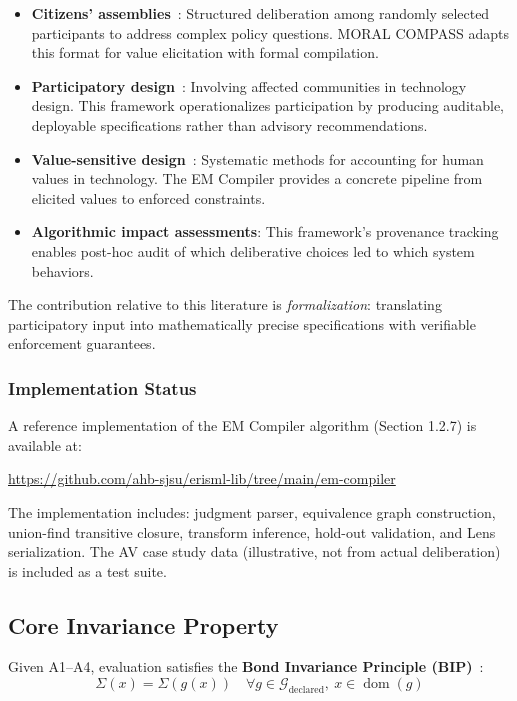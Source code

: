 \documentclass[12pt]{article}
\begin{document}
\begin{itemize}
\item \textbf{Citizens' assemblies}~\cite{fishkin2018}: Structured deliberation among randomly selected participants to
address complex policy questions. MORAL COMPASS adapts this format for value elicitation
with formal compilation.
\item \textbf{Participatory design}~\cite{schuler1993}: Involving affected communities in technology design. This
framework operationalizes participation by producing auditable, deployable specifications
rather than advisory recommendations.
\item \textbf{Value-sensitive design}~\cite{friedman2019}: Systematic methods for accounting for human values in technology. The EM Compiler provides a concrete pipeline from elicited values to enforced constraints.
\item \textbf{Algorithmic impact assessments}: This framework's provenance tracking enables post-hoc
audit of which deliberative choices led to which system behaviors.
\end{itemize}

The contribution relative to this literature is \emph{formalization}: translating participatory input into
mathematically precise specifications with verifiable enforcement guarantees.

\subsubsection{Implementation Status}

A reference implementation of the EM Compiler algorithm (Section 1.2.7) is available at:

\begin{center}
\url{https://github.com/ahb-sjsu/erisml-lib/tree/main/em-compiler}
\end{center}

The implementation includes: judgment parser, equivalence graph construction, union-find transitive closure, transform inference, hold-out validation, and Lens serialization. The AV case study
data (illustrative, not from actual deliberation) is included as a test suite.

\subsection{Core Invariance Property}

Given A1--A4, evaluation satisfies the \textbf{Bond Invariance Principle (BIP)}~\cite{bond2025bip}:
\[
\Sigma(x) = \Sigma(g(x)) \quad \forall g \in \mathcal{G}_{\text{declared}},\ x \in \operatorname{dom}(g)
\]
\end{document}
